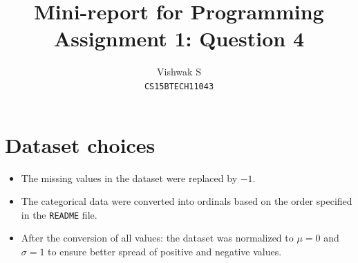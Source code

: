 \documentclass{article}
\title{Mini-report for Programming Assignment 1: Question 4}
\author{Vishwak S \\
\texttt{CS15BTECH11043}}
\date{}
\begin{document}
\maketitle
\section*{Dataset choices}
\begin{itemize}
\item The missing values in the dataset were replaced by \(-1\).
\item The categorical data were converted into ordinals based on the order specified in the \texttt{README} file. 
\item After the conversion of all values: the dataset was normalized to \(\mu= 0\) and \(\sigma=1\) to ensure better spread of positive and negative values.
\end{itemize}
\end{document}
